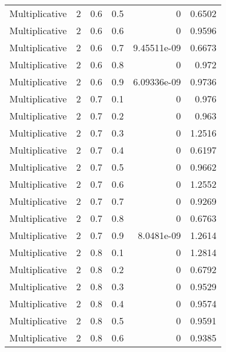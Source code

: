 \documentclass{article}
\begin{document}
\begin{longtable}[H]{lrrrrr}
 Multiplicative &       2 &   0.6 &            0.5 &      0           &          0.6502 \\
 Multiplicative &       2 &   0.6 &            0.6 &      0           &          0.9596 \\
 Multiplicative &       2 &   0.6 &            0.7 &      9.45511e-09 &          0.6673 \\
 Multiplicative &       2 &   0.6 &            0.8 &      0           &          0.972  \\
 Multiplicative &       2 &   0.6 &            0.9 &      6.09336e-09 &          0.9736 \\
 Multiplicative &       2 &   0.7 &            0.1 &      0           &          0.976  \\
 Multiplicative &       2 &   0.7 &            0.2 &      0           &          0.963  \\
 Multiplicative &       2 &   0.7 &            0.3 &      0           &          1.2516 \\
 Multiplicative &       2 &   0.7 &            0.4 &      0           &          0.6197 \\
 Multiplicative &       2 &   0.7 &            0.5 &      0           &          0.9662 \\
 Multiplicative &       2 &   0.7 &            0.6 &      0           &          1.2552 \\
 Multiplicative &       2 &   0.7 &            0.7 &      0           &          0.9269 \\
 Multiplicative &       2 &   0.7 &            0.8 &      0           &          0.6763 \\
 Multiplicative &       2 &   0.7 &            0.9 &      8.0481e-09  &          1.2614 \\
 Multiplicative &       2 &   0.8 &            0.1 &      0           &          1.2814 \\
 Multiplicative &       2 &   0.8 &            0.2 &      0           &          0.6792 \\
 Multiplicative &       2 &   0.8 &            0.3 &      0           &          0.9529 \\
 Multiplicative &       2 &   0.8 &            0.4 &      0           &          0.9574 \\
 Multiplicative &       2 &   0.8 &            0.5 &      0           &          0.9591 \\
 Multiplicative &       2 &   0.8 &            0.6 &      0           &          0.9385 \\

\end{longtable}
\end{document}
